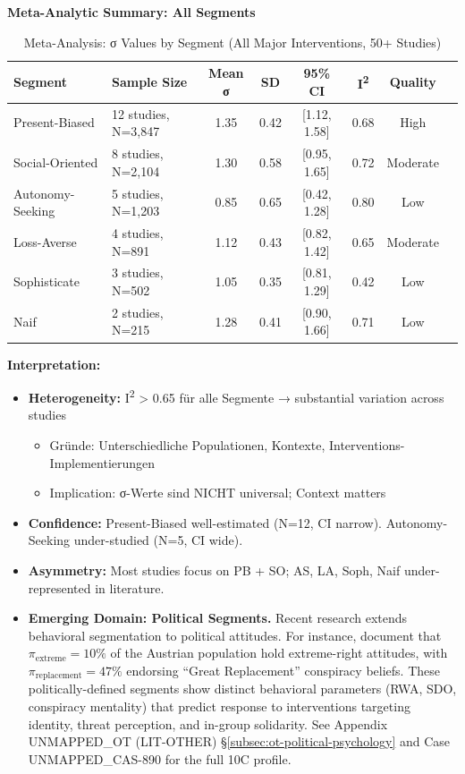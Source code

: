 \textbf{Meta-Analytic Summary: All Segments}

\begin{table}[htbp]
\centering
\caption{Meta-Analysis: σ Values by Segment (All Major Interventions, 50+ Studies)}
\label{tab:19-meta-sigma}
\renewcommand{\arraystretch}{1.3}
\footnotesize
\begin{tabular}{@{}llcccccc@{}}
\toprule
\textbf{Segment} & \textbf{Sample Size} & \textbf{Mean σ} & \textbf{SD} & \textbf{95\% CI} & \textbf{I\textsuperscript{2}} & \textbf{Quality} \\
\midrule
Present-Biased & 12 studies, N=3,847 & 1.35 & 0.42 & [1.12, 1.58] & 0.68 & High \\
Social-Oriented & 8 studies, N=2,104 & 1.30 & 0.58 & [0.95, 1.65] & 0.72 & Moderate \\
Autonomy-Seeking & 5 studies, N=1,203 & 0.85 & 0.65 & [0.42, 1.28] & 0.80 & Low \\
Loss-Averse & 4 studies, N=891 & 1.12 & 0.43 & [0.82, 1.42] & 0.65 & Moderate \\
Sophisticate & 3 studies, N=502 & 1.05 & 0.35 & [0.81, 1.29] & 0.42 & Low \\
Naif & 2 studies, N=215 & 1.28 & 0.41 & [0.90, 1.66] & 0.71 & Low \\
\bottomrule
\end{tabular}
\end{table}

\textbf{Interpretation:}
\begin{itemize}[nosep]
\item \textbf{Heterogeneity:} I\textsuperscript{2} > 0.65 für alle Segmente → substantial variation across studies
  \begin{itemize}[nosep]
  \item Gründe: Unterschiedliche Populationen, Kontexte, Interventions-Implementierungen
  \item Implication: σ-Werte sind NICHT universal; Context matters
  \end{itemize}

\item \textbf{Confidence:} Present-Biased well-estimated (N=12, CI narrow). Autonomy-Seeking under-studied (N=5, CI wide).

\item \textbf{Asymmetry:} Most studies focus on PB + SO; AS, LA, Soph, Naif under-represented in literature.

\item \textbf{Emerging Domain: Political Segments.} Recent research extends behavioral segmentation to political attitudes. For instance, \citet{doew2024rechtsextremismus} document that $\pi_{\text{extreme}} = 10\%$ of the Austrian population hold extreme-right attitudes, with $\pi_{\text{replacement}} = 47\%$ endorsing ``Great Replacement'' conspiracy beliefs. These politically-defined segments show distinct behavioral parameters (RWA, SDO, conspiracy mentality) that predict response to interventions targeting identity, threat perception, and in-group solidarity. See Appendix UNMAPPED_OT (LIT-OTHER) §\ref{subsec:ot-political-psychology} and Case UNMAPPED_CAS-890 for the full 10C profile.
\end{itemize}

